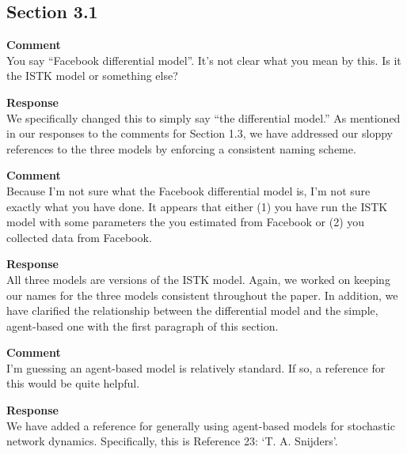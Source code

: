 \subsection{Section 3.1}
\setcounter{rev2-3.1}{1}

\textbf{Comment } \\
You say ``Facebook differential model''.
It's not clear what you mean by this.
Is it the ISTK model or something else?

\textbf{Response } \\
We specifically changed this to simply say ``the differential model.''
As mentioned in our responses to the comments for Section 1.3, we have addressed our sloppy references to the three models by enforcing a consistent naming scheme.

\textbf{Comment } \\
Because I'm not sure what the Facebook differential model is, I'm not sure exactly what you have done.
It appears that either (1) you have run the ISTK model with some parameters the you estimated from Facebook or (2) you collected data from Facebook.

\textbf{Response } \\
All three models are versions of the ISTK model.
Again, we worked on keeping our names for the three models consistent throughout the paper.
In addition, we have clarified the relationship between the differential model and the simple, agent-based one with the first paragraph of this section.

\textbf{Comment } \\
I'm guessing an agent-based model is relatively standard.
If so, a reference for this would be quite helpful.

\textbf{Response } \\
We have added a reference for generally using agent-based models for stochastic network dynamics.
Specifically, this is Reference 23: `T. A. Snijders'.
